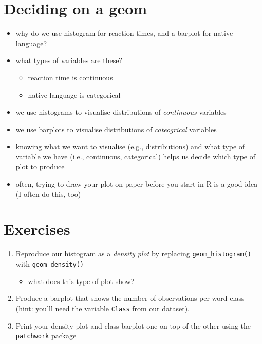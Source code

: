 \documentclass[
  letterpaper,
  DIV=11]{scrartcl}
\providecommand{\tightlist}{%
  \setlength{\itemsep}{0pt}\setlength{\parskip}{0pt}}\usepackage{longtable,booktabs,array}
\theoremstyle{definition}
\theoremstyle{remark}
\begin{document}
\hypertarget{deciding-on-a-geom}{%
\section{Deciding on a geom}\label{deciding-on-a-geom}}

\begin{itemize}
\tightlist
\item
  why do we use histogram for reaction times, and a barplot for native
  language?
\item
  what types of variables are these?

  \begin{itemize}
  \tightlist
  \item
    reaction time is continuous
  \item
    native language is categorical
  \end{itemize}
\item
  we use histograms to visualise distributions of \emph{continuous}
  variables
\item
  we use barplots to visualise distributions of \emph{cateogrical}
  variables
\item
  knowing what we want to visualise (e.g., distributions) and what type
  of variable we have (i.e., continuous, categorical) helps us decide
  which type of plot to produce
\item
  often, trying to draw your plot on paper before you start in R is a
  good idea (I often do this, too)
\end{itemize}

\hypertarget{exercises}{%
\section{Exercises}\label{exercises}}

\begin{enumerate}
\def\labelenumi{\arabic{enumi}.}
\item
  Reproduce our histogram as a \emph{density plot} by replacing
  \texttt{geom\_histogram()} with \texttt{geom\_density()}

  \begin{itemize}
  \tightlist
  \item
    what does this type of plot show?
  \end{itemize}
\item
  Produce a barplot that shows the number of observations per word class
  (hint: you'll need the variable \texttt{Class} from our dataset).
\item
  Print your density plot and class barplot one on top of the other
  using the \texttt{patchwork} package
\end{enumerate}
\end{document}
